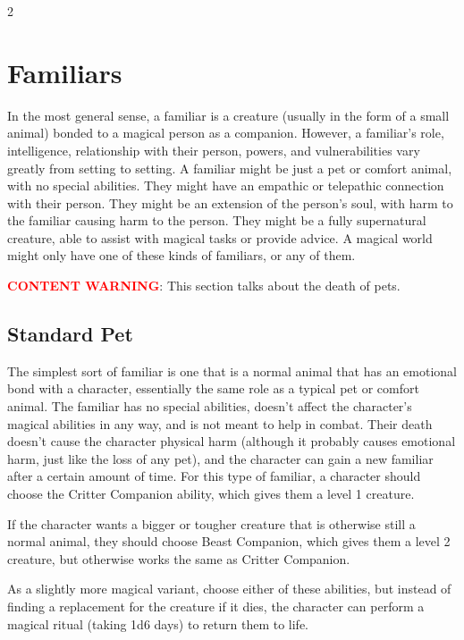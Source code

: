 \begin{multicols}{2}

\chapter{Familiars}

In the most general sense, a familiar is a creature (usually in the form of a small animal) bonded to a magical person as a companion. However, a familiar’s role, intelligence, relationship with their person, powers, and vulnerabilities vary greatly from setting to setting. A familiar might be just a pet or comfort animal, with no special abilities. They might have an empathic or telepathic connection with their person. They might be an extension of the person’s soul, with harm to the familiar causing harm to the person. They might be a fully supernatural creature, able to assist with magical tasks or provide advice. A magical world might only have one of these kinds of familiars, or any of them.

\textcolor{red}{\textbf{CONTENT WARNING}}: This section talks about the death of pets.

\section{Standard Pet}

The simplest sort of familiar is one that is a normal animal that has an emotional bond with a character, essentially the same role as a typical pet or comfort animal. The familiar has no special abilities, doesn’t affect the character’s magical abilities in any way, and is not meant to help in combat. Their death doesn’t cause the character physical harm (although it probably causes emotional harm, just like the loss of any pet), and the character can gain a new familiar after a certain amount of time. For this type of familiar, a character should choose the Critter Companion ability, which gives them a level 1 creature.

If the character wants a bigger or tougher creature that is otherwise still a normal animal, they should choose Beast Companion, which gives them a level 2 creature, but otherwise works the same as Critter Companion. 

As a slightly more magical variant, choose either of these abilities, but instead of finding a replacement for the creature if it dies, the character can perform a magical ritual (taking 1d6 days) to return them to life.


\end{multicols}
